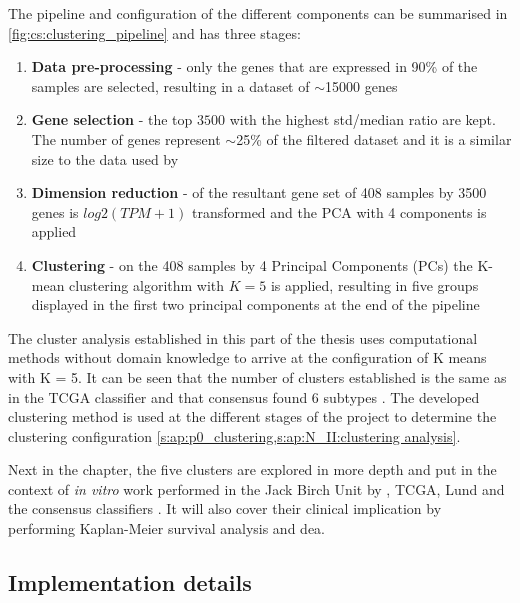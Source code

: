 The pipeline and configuration of the different components can be summarised in \cref{fig:cs:clustering_pipeline} and has three stages:
\begin{enumerate}
    \item \textbf{Data pre-processing} - only the genes that are expressed in 90\% of the samples are selected, resulting in a dataset of $\sim$15000 genes
    \item \textbf{Gene selection} - the top $3500$ with the highest std/median ratio are kept. The number of genes represent $\sim$25\% of the filtered dataset and it is a similar size to the data used by \citet{Robertson2017-mg}
    \item \textbf{Dimension reduction} - of the resultant gene set of 408 samples by 3500 genes is $log2(TPM+1)$ transformed and the PCA with 4 components is applied
    \item \textbf{Clustering} - on the 408 samples by 4 Principal Components (PCs) the K-mean clustering algorithm with $K=5$ is applied, resulting in five groups displayed in the first two principal components at the end of the pipeline
\end{enumerate}

The cluster analysis established in this part of the thesis uses computational methods without domain knowledge to arrive at the configuration of K means with K = 5. It can be seen that the number of clusters established is the same as in the TCGA classifier \citep{Robertson2017-mg} and that consensus found 6 subtypes \citep{Kamoun2020-tj}. The developed clustering method is used at the different stages of the project to determine the clustering configuration \cref{s:ap:p0_clustering,s:ap:N_II:clustering analysis}.

Next in the chapter, the five clusters are explored in more depth and put in the context of \textit{in vitro} work performed in the Jack Birch Unit by \citet{Baker2022-bj}, TCGA, Lund and the consensus classifiers \citep{Robertson2017-mg, Marzouka2018-ge, Kamoun2020-tj}. It will also cover their clinical implication by performing Kaplan-Meier survival analysis and \acrlong{dea}.

\subsection*{Implementation details}


